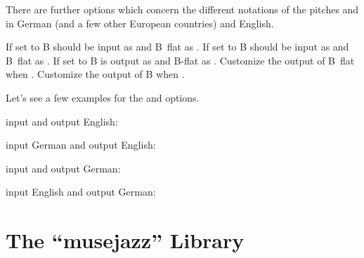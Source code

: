 \documentclass[load-preamble+]{cnltx-doc}
\def\library*#1{``#1''}%
\begin{document}
There are further options which concern the different notations of the pitches
 and  in German (and a few other European
countries) and English.
\begin{options}
    If set to  B should be input as 
    and B~flat as . If set to  B should be input as
     and B~flat as .
    If set to
     B is output as  and B-flat as .
    Customize the output of B~flat when
    .
    Customize the output of B when
    .
\end{options}

Let's see a few examples for the  and
 options.

\begin{example}
  input and output English:\par
    \par
    \par
  \medskip

  input German and output English:\par
    \par
    \par
  \medskip

  input and output German:\par
    \par
    \par

  \medskip
  input English and output German:\par
    \par
    
\end{example}

\section{The \library*{musejazz} Library}\label{sec:musejazz-libr}
\end{document}
